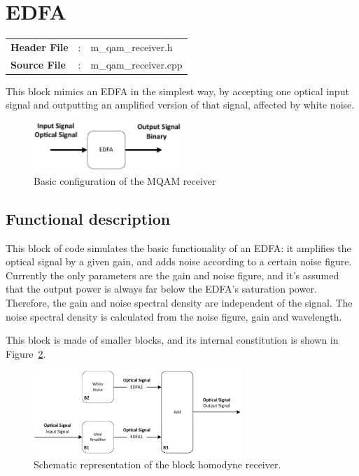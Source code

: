 \clearpage

\section{EDFA}

\begin{tcolorbox}	
	\begin{tabular}{p{2.75cm} p{0.2cm} p{10.5cm}} 	
		\textbf{Header File}   &:& m\_qam\_receiver.h \\
		\textbf{Source File}   &:& m\_qam\_receiver.cpp \\
	\end{tabular}
\end{tcolorbox}

This block mimics  an EDFA in the simplest way, by accepting one optical input
signal and outputting an amplified version of that signal, affected by white
noise.

\begin{figure}[h]
	\centering
	\includegraphics[width=0.5\textwidth]{./lib/edfa/figures/edfa_simple}
	\caption{Basic configuration of the MQAM
	receiver}\label{fig:edfa_simple}
\end{figure}

\subsection*{Functional description}

This block of code simulates the basic functionality of an EDFA: it amplifies
the optical signal by a given gain, and adds noise according to a certain noise
figure. Currently the only parameters are the gain and noise figure, and it's
assumed that the output power is always far below the EDFA's saturation
power. Therefore, the gain and noise spectral density are independent of the
signal. The noise spectral density is calculated from the noise
figure, gain and wavelength.

This block is made of smaller blocks, and its internal constitution is shown in
Figure~\ref{fig:edfa_blocks}.

\begin{figure}[h]
	\centering
	\includegraphics[width=0.7\textwidth]{./lib/edfa/figures/edfa_blocks}
	\caption{Schematic representation of the block homodyne
	receiver.}\label{fig:edfa_blocks}
\end{figure}

